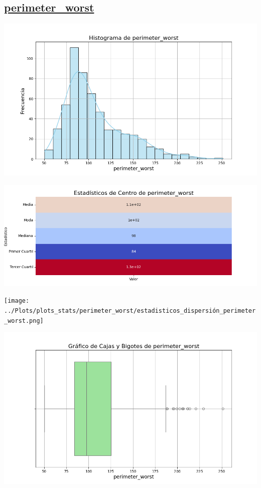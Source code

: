 \documentclass[a4paper, 12pt]{article}
\begin{document}
\subsection*{\underline{perimeter\_worst}}

	\includegraphics[width=\textwidth]{../Plots/plots_stats/perimeter_worst/histograma_perimeter_worst.png}




\includegraphics[width=\textwidth]{../Plots/plots_stats/perimeter_worst/estadisticas_centro_perimeter_worst.png}




\texttt{[image: ../Plots/plots\_stats/perimeter\_worst/estadisticos\_dispersión\_perimeter\_worst.png]}



\includegraphics[width=\textwidth]{../Plots/plots_stats/perimeter_worst/boxplot_perimeter_worst.png}
\end{document}
